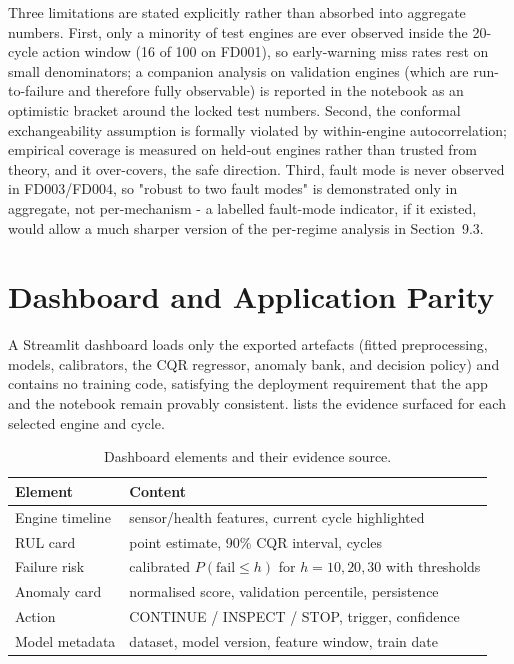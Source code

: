 \documentclass[9pt,a4paper,twocolumn,twoside]{rho-class/rho}
\begin{document}
    Three limitations are stated explicitly rather than absorbed into aggregate numbers. First, only a minority of test engines are ever observed inside the 20-cycle action window (16 of 100 on FD001), so early-warning miss rates rest on small denominators; a companion analysis on validation engines (which are run-to-failure and therefore fully observable) is reported in the notebook as an optimistic bracket around the locked test numbers. Second, the conformal exchangeability assumption is formally violated by within-engine autocorrelation; empirical coverage is measured on held-out engines rather than trusted from theory, and it over-covers, the safe direction. Third, fault mode is never observed in FD003/FD004, so "robust to two fault modes" is demonstrated only in aggregate, not per-mechanism - a labelled fault-mode indicator, if it existed, would allow a much sharper version of the per-regime analysis in Section~9.3.

\section{Dashboard and Application Parity}
\label{sec:app}

    A Streamlit dashboard loads only the exported artefacts (fitted preprocessing, models, calibrators, the CQR regressor, anomaly bank, and decision policy) and contains no training code, satisfying the deployment requirement that the app and the notebook remain provably consistent.  lists the evidence surfaced for each selected engine and cycle.

    \begin{table}[H]
        \caption{Dashboard elements and their evidence source.}
        \label{tab:dashboard}
        \begin{tabular}{
            >{\raggedright\arraybackslash}p{}
            >{\raggedright\arraybackslash}p{}
        }
        \toprule
        \textbf{Element} & \textbf{Content} \\
        \midrule
        Engine timeline & sensor/health features, current cycle highlighted \\
        RUL card & point estimate, 90\% CQR interval, cycles \\
        Failure risk & calibrated $P(\mathrm{fail}\le h)$ for $h{=}10,20,30$ with thresholds \\
        Anomaly card & normalised score, validation percentile, persistence \\
        Action & CONTINUE / INSPECT / STOP, trigger, confidence \\
        Model metadata & dataset, model version, feature window, train date \\
        \bottomrule
        \end{tabular}
    \end{table}
\end{document}
